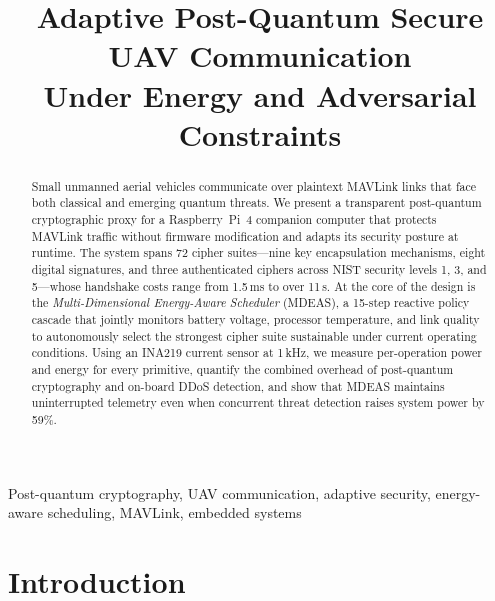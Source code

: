 \documentclass[conference]{IEEEtran}
\newcommand{\mdeas}{\textsc{MDEAS}}
\begin{document}
\title{Adaptive Post-Quantum Secure UAV Communication\\
Under Energy and Adversarial Constraints}

\author{}

\maketitle

\begin{abstract}
Small unmanned aerial vehicles communicate over plaintext MAVLink
links that face both classical and emerging quantum threats.
We present a transparent post-quantum cryptographic proxy for a
Raspberry~Pi~4 companion computer that protects MAVLink traffic
without firmware modification and adapts its security posture at
runtime.  The system spans 72 cipher suites---nine key encapsulation
mechanisms, eight digital signatures, and three authenticated
ciphers across NIST security levels 1, 3, and 5---whose handshake
costs range from 1.5\,ms to over 11\,s.  At the core of the
design is the \emph{Multi-Dimensional Energy-Aware Scheduler}
(\mdeas{}), a 15-step reactive policy cascade that jointly monitors
battery voltage, processor temperature, and link quality to
autonomously select the strongest cipher suite sustainable under
current operating conditions.  Using an INA219 current sensor at
1\,kHz, we measure per-operation power and energy for every
primitive, quantify the combined overhead of post-quantum
cryptography and on-board DDoS detection, and show that \mdeas{}
maintains uninterrupted telemetry even when concurrent threat
detection raises system power by 59\%.
\end{abstract}

\begin{IEEEkeywords}
Post-quantum cryptography, UAV communication, adaptive security,
energy-aware scheduling, MAVLink, embedded systems
\end{IEEEkeywords}

\section{Introduction}
\label{sec:intro}
\end{document}
